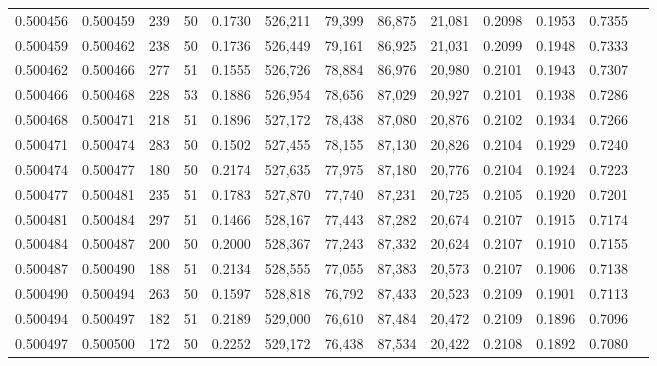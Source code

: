 \begin{tabular}{rrrrrrrrrrrrr}
0.500456 & 0.500459 & 239 &  50 &                                     0.1730 & 526,211 &  79,399 &  86,875 &  21,081 & 0.2098 & 0.1953 & 0.7355 \\
0.500459 & 0.500462 & 238 &  50 &                                     0.1736 & 526,449 &  79,161 &  86,925 &  21,031 & 0.2099 & 0.1948 & 0.7333 \\
0.500462 & 0.500466 & 277 &  51 &                                     0.1555 & 526,726 &  78,884 &  86,976 &  20,980 & 0.2101 & 0.1943 & 0.7307 \\
0.500466 & 0.500468 & 228 &  53 &                                     0.1886 & 526,954 &  78,656 &  87,029 &  20,927 & 0.2101 & 0.1938 & 0.7286 \\
0.500468 & 0.500471 & 218 &  51 &                                     0.1896 & 527,172 &  78,438 &  87,080 &  20,876 & 0.2102 & 0.1934 & 0.7266 \\
0.500471 & 0.500474 & 283 &  50 &                                     0.1502 & 527,455 &  78,155 &  87,130 &  20,826 & 0.2104 & 0.1929 & 0.7240 \\
0.500474 & 0.500477 & 180 &  50 &                                     0.2174 & 527,635 &  77,975 &  87,180 &  20,776 & 0.2104 & 0.1924 & 0.7223 \\
0.500477 & 0.500481 & 235 &  51 &                                     0.1783 & 527,870 &  77,740 &  87,231 &  20,725 & 0.2105 & 0.1920 & 0.7201 \\
0.500481 & 0.500484 & 297 &  51 &                                     0.1466 & 528,167 &  77,443 &  87,282 &  20,674 & 0.2107 & 0.1915 & 0.7174 \\
0.500484 & 0.500487 & 200 &  50 &                                     0.2000 & 528,367 &  77,243 &  87,332 &  20,624 & 0.2107 & 0.1910 & 0.7155 \\
0.500487 & 0.500490 & 188 &  51 &                                     0.2134 & 528,555 &  77,055 &  87,383 &  20,573 & 0.2107 & 0.1906 & 0.7138 \\
0.500490 & 0.500494 & 263 &  50 &                                     0.1597 & 528,818 &  76,792 &  87,433 &  20,523 & 0.2109 & 0.1901 & 0.7113 \\
0.500494 & 0.500497 & 182 &  51 &                                     0.2189 & 529,000 &  76,610 &  87,484 &  20,472 & 0.2109 & 0.1896 & 0.7096 \\
0.500497 & 0.500500 & 172 &  50 &                                     0.2252 & 529,172 &  76,438 &  87,534 &  20,422 & 0.2108 & 0.1892 & 0.7080 \\

\end{tabular}
